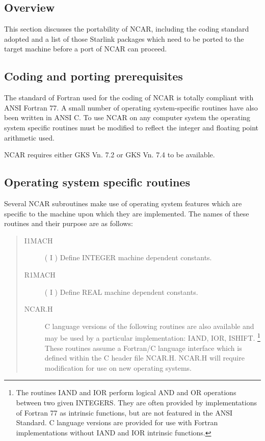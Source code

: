 \subsection {Overview}

This section discusses the portability of NCAR, including the coding 
standard adopted and a list of those Starlink packages which 
need to be ported to the target machine before a port of NCAR can proceed.


\subsection {Coding and porting prerequisites}

The standard of Fortran used for the coding of NCAR is totally
compliant with ANSI Fortran 77.
A small number of operating system-specific routines have also been written
in ANSI C.
To use NCAR on any computer system the operating system specific routines
must be modified to reflect the integer and floating point arithmetic used.

NCAR requires either GKS Vn. 7.2 or GKS Vn. 7.4 to be available.


\subsection {Operating system specific routines}

Several NCAR subroutines make use of operating system features which are
specific to the machine upon which they are implemented.
The names of these routines and their purpose are as follows:

\begin {quote}
\begin {description}
\item [I1MACH] ( I ) 
\subitem Define INTEGER machine dependent constants.
\indexspace
\item [R1MACH] ( I ) 
\subitem Define REAL machine dependent constants.
\indexspace
\item [NCAR.H] \hfill
\subitem C language versions of the following routines are also available
and may be used by a particular implementation: IAND, IOR, ISHIFT.
\footnote{The routines IAND and IOR
perform logical AND and OR operations between two given INTEGERS. 
They are  often provided by implementations of Fortran 77 as intrinsic
functions, but are not featured in the ANSI Standard.
C language versions are provided for use with Fortran implementations without
IAND and IOR intrinsic functions.}
These routines assume a Fortran/C language interface which is defined
within the C header file NCAR.H.
NCAR.H will require modification for use on new operating systems.
\end {description}
\end {quote}


